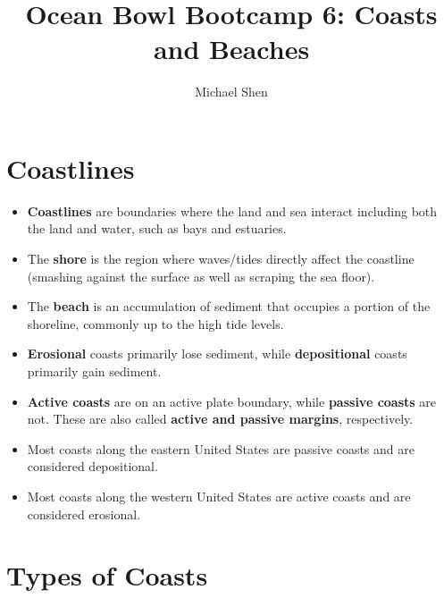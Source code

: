 \documentclass{article}
\begin{document}
\title{Ocean Bowl Bootcamp 6: Coasts and Beaches}
\author{Michael Shen}
\maketitle

\section{Coastlines}

\begin{itemize}
	\item \textbf{Coastlines} are boundaries where the land and sea interact including both the land and water, such as bays and estuaries.
	\item The \textbf{shore} is the region where waves/tides directly affect the coastline (smashing against the surface as well as scraping the sea floor).
	\item The \textbf{beach} is an accumulation of sediment that occupies a portion of the shoreline, commonly up to the high tide levels.
	\item \textbf{Erosional} coasts primarily lose sediment, while \textbf{depositional} coasts primarily gain sediment.
	\item \textbf{Active coasts} are on an active plate boundary, while \textbf{passive coasts} are not. These are also called \textbf{active and passive margins}, respectively.
	\item Most coasts along the eastern United States are passive coasts and are considered depositional.
	\item Most coasts along the western United States are active coasts and are considered erosional.
\end{itemize}
	
\section{Types of Coasts}
\end{document}
